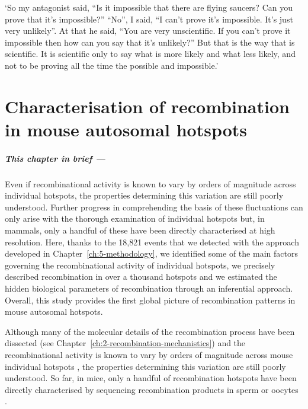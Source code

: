 \begin{savequote}[8cm]
	
	‘So my antagonist said, “Is it impossible that there are flying saucers? Can you prove that it's impossible?” “No”, I said, “I can't prove it's impossible. It's just very unlikely”. At that he said, “You are very unscientific. If you can't prove it impossible then how can you say that it's unlikely?” But that is the way that is scientific. It is scientific only to say what is more likely and what less likely, and not to be proving all the time the possible and impossible.’
	
	
\end{savequote}

\chapter{\label{ch:6-recombination-parameters}Characterisation of recombination in mouse autosomal hotspots}


\minitoc{}

{\small{} \itshape{}

\paragraph{This chapter in brief —}

Even if recombinational activity is known to vary by orders of magnitude across individual hotspots, the properties determining this variation are still poorly understood.
Further progress in comprehending the basis of these fluctuations can only arise with the thorough examination of individual hotspots but, in mammals, only a handful of these have been directly characterised at high resolution.
Here, thanks to the 18,821 events that we detected with the approach developed in Chapter~\ref{ch:5-methodology}, we identified some of the main factors governing the recombinational activity of individual hotspots, we precisely described recombination in over a thousand hotspots and we estimated the hidden biological parameters of recombination through an inferential approach.
Overall, this study provides the first global picture of recombination patterns in mouse autosomal hotspots.

}

\newpage


Although many of the molecular details of the recombination process have been dissected (see Chapter~\ref{ch:2-recombination-mechanistics}) and the recombinational activity is known to vary by orders of magnitude across mouse individual hotspots \citep{paigen2008recombinational}, the properties determining this variation are still poorly understood.
So far, in mice, only a handful of recombination hotspots have been directly characterised by sequencing recombination products in sperm or oocytes \citep{yauk2003highresolution,bois2007highly,baudat2007cis,ng2008quantitative,cole2010comprehensive,cole2014mouse}.

